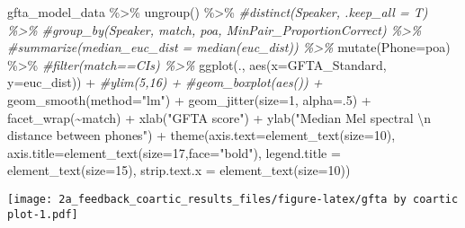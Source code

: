 \documentclass[
]{article}
\newenvironment{Shaded}{\begin{snugshade}}{\end{snugshade}}
\newcommand{\AttributeTok}[1]{\textcolor[rgb]{0.77,0.63,0.00}{#1}}
\newcommand{\CommentTok}[1]{\textcolor[rgb]{0.56,0.35,0.01}{\textit{#1}}}
\newcommand{\DecValTok}[1]{\textcolor[rgb]{0.00,0.00,0.81}{#1}}
\newcommand{\FunctionTok}[1]{\textcolor[rgb]{0.00,0.00,0.00}{#1}}
\newcommand{\NormalTok}[1]{#1}
\newcommand{\SpecialCharTok}[1]{\textcolor[rgb]{0.00,0.00,0.00}{#1}}
\newcommand{\StringTok}[1]{\textcolor[rgb]{0.31,0.60,0.02}{#1}}
\begin{document}
\begin{Shaded}
\begin{Highlighting}[]
\NormalTok{ gfta\_model\_data }\SpecialCharTok{\%\textgreater{}\%}
   \FunctionTok{ungroup}\NormalTok{() }\SpecialCharTok{\%\textgreater{}\%}
   \CommentTok{\#distinct(Speaker, .keep\_all = T) \%\textgreater{}\%}
  \CommentTok{\#group\_by(Speaker, match, poa, MinPair\_ProportionCorrect) \%\textgreater{}\%}
  \CommentTok{\#summarize(median\_euc\_dist = median(euc\_dist)) \%\textgreater{}\%}
  \FunctionTok{mutate}\NormalTok{(}\AttributeTok{Phone=}\NormalTok{poa) }\SpecialCharTok{\%\textgreater{}\%}
  \CommentTok{\#filter(match==\textquotesingle{}CIs\textquotesingle{}) \%\textgreater{}\%}
  \FunctionTok{ggplot}\NormalTok{(., }\FunctionTok{aes}\NormalTok{(}\AttributeTok{x=}\NormalTok{GFTA\_Standard, }\AttributeTok{y=}\NormalTok{euc\_dist)) }\SpecialCharTok{+} 
  \CommentTok{\#ylim(5,16) + }
  \CommentTok{\#geom\_boxplot(aes()) + }
  \FunctionTok{geom\_smooth}\NormalTok{(}\AttributeTok{method=}\StringTok{"lm"}\NormalTok{) }\SpecialCharTok{+} 
   \FunctionTok{geom\_jitter}\NormalTok{(}\AttributeTok{size=}\DecValTok{1}\NormalTok{, }\AttributeTok{alpha=}\NormalTok{.}\DecValTok{5}\NormalTok{) }\SpecialCharTok{+}
  \FunctionTok{facet\_wrap}\NormalTok{(}\SpecialCharTok{\textasciitilde{}}\NormalTok{match) }\SpecialCharTok{+}
  \FunctionTok{xlab}\NormalTok{(}\StringTok{"GFTA score"}\NormalTok{) }\SpecialCharTok{+} 
  \FunctionTok{ylab}\NormalTok{(}\StringTok{"Median Mel spectral }\SpecialCharTok{\textbackslash{}n}\StringTok{ distance between phones"}\NormalTok{) }\SpecialCharTok{+} 
  \FunctionTok{theme}\NormalTok{(}\AttributeTok{axis.text=}\FunctionTok{element\_text}\NormalTok{(}\AttributeTok{size=}\DecValTok{10}\NormalTok{),}
      \AttributeTok{axis.title=}\FunctionTok{element\_text}\NormalTok{(}\AttributeTok{size=}\DecValTok{17}\NormalTok{,}\AttributeTok{face=}\StringTok{"bold"}\NormalTok{),}
      \AttributeTok{legend.title =} \FunctionTok{element\_text}\NormalTok{(}\AttributeTok{size=}\DecValTok{15}\NormalTok{),}
      \AttributeTok{strip.text.x =} \FunctionTok{element\_text}\NormalTok{(}\AttributeTok{size=}\DecValTok{10}\NormalTok{)) }
\end{Highlighting}
\end{Shaded}

\texttt{[image: 2a\_feedback\_coartic\_results\_files/figure-latex/gfta by coartic plot-1.pdf]}
\end{document}
